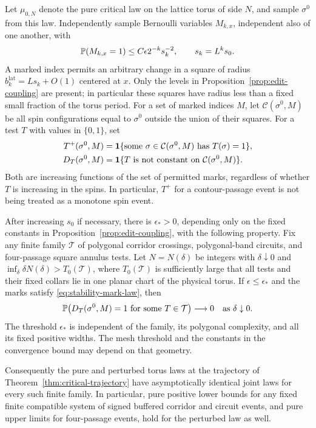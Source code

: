 Let $\mu_{0,N}$ denote the pure critical law on the lattice torus of side
$N$, and sample $\sigma^0$ from this law.  Independently sample Bernoulli
variables $M_{k,x}$, independent also of one another, with
\begin{equation}
 \P(M_{k,x}=1)\leq C\epsilon 2^{-k}s_k^{-2},
 \qquad s_k=L^ks_0.
 \label{eq:stability-mark-law}
\end{equation}
A marked index permits an arbitrary change in a square of radius
$b_k^{\mathrm{lat}}=Ls_k+O(1)$ centered at $x$.  Only the levels in
Proposition~\ref{prop:edit-coupling} are present; in particular these
squares have radius less than a fixed small fraction of the torus period.
For a set of marked indices $M$, let $\mathcal C(\sigma^0,M)$ be all spin
configurations equal to $\sigma^0$ outside the union of their squares.
For a test $T$ with values in $\{0,1\}$, set
\begin{align}
 T^+(\sigma^0,M)&=\one\{\text{some }\sigma\in\mathcal C(\sigma^0,M)
                    \text{ has }T(\sigma)=1\},\nonumber\\
 D_T(\sigma^0,M)&=\one\{T\text{ is not constant on }\mathcal C(\sigma^0,M)\}.
 \label{eq:stability-possibility}
\end{align}
Both are increasing functions of the set of permitted marks, regardless
of whether $T$ is increasing in the spins.  In particular, $T^+$ for a
contour-passage event is not being treated as a monotone spin event.

\begin{theorem}
\label{thm:bulk-stability}
After increasing $s_0$ if necessary, there is $\epsilon_*>0$, depending
only on the fixed constants in Proposition~\ref{prop:edit-coupling}, with
the following property.  Fix any finite family $\mathcal T$ of polygonal
corridor crossings, polygonal-band circuits, and four-passage square
annulus tests.  Let $N=N(\delta)$ be integers with $\delta\downarrow0$
and $\inf_\delta\delta N(\delta)>T_0(\mathcal T)$, where
$T_0(\mathcal T)$ is sufficiently large that all tests and their
fixed collars lie in one planar chart of the physical torus.  If
$\epsilon\leq\epsilon_*$ and the marks satisfy
\eqref{eq:stability-mark-law}, then
\begin{equation}
 \P\bigl(D_T(\sigma^0,M)=1\text{ for some }T\in\mathcal T\bigr)
 \longrightarrow0
 \quad\text{as }\delta\downarrow0.
 \label{eq:stability-main}
\end{equation}
The threshold $\epsilon_*$ is independent of the family, its polygonal
complexity, and all its fixed positive widths.  The mesh threshold and
the constants in the convergence bound may depend on that geometry.

Consequently the pure and perturbed torus laws at the trajectory of
Theorem~\ref{thm:critical-trajectory} have asymptotically identical joint
laws for every such finite family.  In particular, pure positive lower
bounds for any fixed finite compatible system of signed buffered
corridor and circuit events, and pure upper limits for four-passage
events, hold for the perturbed law as well.
\end{theorem}

